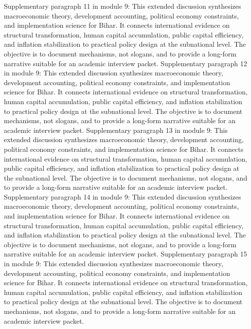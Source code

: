 \documentclass[preprint,12pt]{elsarticle}
\begin{document}
Supplementary paragraph 11 in module 9: This extended discussion synthesizes macroeconomic theory, development accounting, political economy constraints, and implementation science for Bihar. It connects international evidence on structural transformation, human capital accumulation, public capital efficiency, and inflation stabilization to practical policy design at the subnational level. The objective is to document mechanisms, not slogans, and to provide a long-form narrative suitable for an academic interview packet.
Supplementary paragraph 12 in module 9: This extended discussion synthesizes macroeconomic theory, development accounting, political economy constraints, and implementation science for Bihar. It connects international evidence on structural transformation, human capital accumulation, public capital efficiency, and inflation stabilization to practical policy design at the subnational level. The objective is to document mechanisms, not slogans, and to provide a long-form narrative suitable for an academic interview packet.
Supplementary paragraph 13 in module 9: This extended discussion synthesizes macroeconomic theory, development accounting, political economy constraints, and implementation science for Bihar. It connects international evidence on structural transformation, human capital accumulation, public capital efficiency, and inflation stabilization to practical policy design at the subnational level. The objective is to document mechanisms, not slogans, and to provide a long-form narrative suitable for an academic interview packet.
Supplementary paragraph 14 in module 9: This extended discussion synthesizes macroeconomic theory, development accounting, political economy constraints, and implementation science for Bihar. It connects international evidence on structural transformation, human capital accumulation, public capital efficiency, and inflation stabilization to practical policy design at the subnational level. The objective is to document mechanisms, not slogans, and to provide a long-form narrative suitable for an academic interview packet.
Supplementary paragraph 15 in module 9: This extended discussion synthesizes macroeconomic theory, development accounting, political economy constraints, and implementation science for Bihar. It connects international evidence on structural transformation, human capital accumulation, public capital efficiency, and inflation stabilization to practical policy design at the subnational level. The objective is to document mechanisms, not slogans, and to provide a long-form narrative suitable for an academic interview packet.
\end{document}
